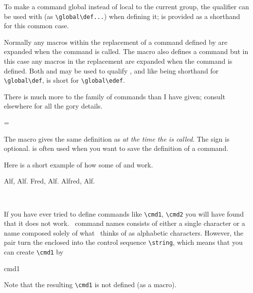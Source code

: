     To make a command global instead of local to the current group, 
the \cmd{\global} qualifier can be used with \cmd{\def} 
(as \verb?\global\def...?) when defining it;
\cmd{\gdef} is provided as a shorthand for this common case.

    Normally any macros within the replacement  of a command
defined by \cmd{\def} are expanded when the command is called. 
The macro \cmd{\edef} also defines a command but in this case any macros
in the replacement  are expanded when the command is defined.
Both \cmd{\long} and \cmd{\global} may be used to qualify \cmd{\edef},
and like \cmd{\gdef} being shorthand for \verb?\global\def?, \cmd{\xdef}
is short for \verb?\global\edef?.

    There is much more to the \cmd{\def} family of commands than I have
given; consult elsewhere for all the gory details.

\begin{syntax}
\cmd{\let}= \\
\end{syntax}
The \cmd{\let} macro gives  the same definition as 
\emph{at the time the \cmd{\let} is called}. The \Itt{=} sign is optional.
\cmd{\let} is often used when you want to save the definition of a
command.

    Here is a short example of how some of \cmd{\def} and \cmd{\let} work.
\begin{lcode}
\def\name{Alf}
\let\fred = \name
  \name, \fred.         %
\def\name{Fred}
  \name, \fred.         %
\def\name{\fred red}
  \name, \fred.         %
\end{lcode}

\begin{syntax}
\cmd{\csname} \cmd{\endcsname} \\
\end{syntax}
If you have ever tried to define commands like \verb?\cmd1?, \verb?\cmd2? you will
have found that it does not work. \tx\ command names consists of either
a single character or a name composed solely of what \tx\ thinks
of as alphabetic characters. However, the \cmd{\csname} \cmd{\endcsname}
pair turn the enclosed  into the control sequence \verb?\string?,
which means that you can create \verb?\cmd1? by 
\begin{lcode}
\csname cmd1\endcsname
\end{lcode}
Note that the resulting \verb?\cmd1? is not defined (as a macro).

